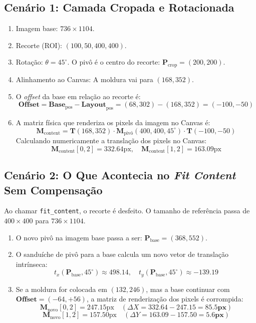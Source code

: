 \documentclass[12pt,a4paper]{article}
\begin{document}
\subsection{Cenário 1: Camada Cropada e Rotacionada}
\begin{enumerate}
    \item Imagem base: $736 \times 1104$.
    \item Recorte (ROI): $(100, 50, 400, 400)$.
    \item Rotação: $\theta = 45^\circ$. O pivô é o centro do recorte: $\mathbf{P}_{\text{crop}} = (200, 200)$.
    \item Alinhamento ao Canvas: A moldura vai para $(168, 352)$.
    \item O \textit{offset} da base em relação ao recorte é:
    $$\mathbf{Offset} = \mathbf{Base}_{\text{pos}} - \mathbf{Layout}_{\text{pos}} = (68, 302) - (168, 352) = (-100, -50)$$
    \item A matriz física que renderiza os pixels da imagem no Canvas é:
    \begin{equation}
    \mathbf{M}_{\text{content}} = \mathbf{T}(168, 352) \cdot \mathbf{M}_{\text{pivô}}(400, 400, 45^\circ) \cdot \mathbf{T}(-100, -50)
    \end{equation}
    Calculando numericamente a translação dos pixels no Canvas:
    $$\mathbf{M}_{\text{content}}[0, 2] = 332.64\text{px}, \quad \mathbf{M}_{\text{content}}[1, 2] = 163.09\text{px}$$
\end{enumerate}

\subsection{Cenário 2: O Que Acontecia no \textit{Fit Content} Sem Compensação}

Ao chamar \texttt{fit\_content}, o recorte é desfeito. O tamanho de referência passa de $400 \times 400$ para $736 \times 1104$.

\begin{enumerate}
    \item O novo pivô na imagem base passa a ser: $\mathbf{P}_{\text{base}} = (368, 552)$.
    \item O sanduíche de pivô para a base calcula um novo vetor de translação intrínseca:
    $$t_x(\mathbf{P}_{\text{base}}, 45^\circ) \approx 498.14, \quad t_y(\mathbf{P}_{\text{base}}, 45^\circ) \approx -139.19$$
    \item Se a moldura for colocada em $(132, 246)$, mas a base continuar com $\mathbf{Offset} = (-64, +56)$, a matriz de renderização dos pixels é corrompida:
    $$\mathbf{M}_{\text{novo}}[0, 2] = 247.15\text{px} \quad (\Delta X = 332.64 - 247.15 = \mathbf{85.5\text{px}})$$
    $$\mathbf{M}_{\text{novo}}[1, 2] = 157.50\text{px} \quad (\Delta Y = 163.09 - 157.50 = \mathbf{5.6\text{px}})$$
\end{enumerate}
\end{document}

